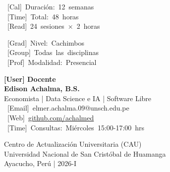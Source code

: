 \documentclass[12pt,a4paper]{yaac-luatex}
\newcommand{\faCalendar}{[Cal]}
\newcommand{\faClock}{[Time]}
\newcommand{\faBookReader}{[Read]}
\newcommand{\faUserGraduate}{[Grad]}
\newcommand{\faUsers}{[Group]}
\newcommand{\faChalkboardTeacher}{[Prof]}
\newcommand{\faUser}{[User]}
\newcommand{\faEnvelope}{[Email]}
\newcommand{\faGlobe}{[Web]}
\newcommand{\icontext}[2]{
	\mbox{%
		\textcolor{maincolor}{#1}\hspace{0.3em}%
		{#2}%
	}%
}
\begin{document}
\begin{titlepage}
\begin{tcolorbox}[
			enhanced,
			colback=white,
			colframe=maincolor,
			arc=3pt,
			boxrule=2pt,
			left=15pt,
			right=15pt,
			top=12pt,
			bottom=12pt,
			width=0.9\textwidth
			]
		\end{tcolorbox}
		
		\vspace{1cm}
		
		\begin{minipage}{0.45\textwidth}
			\begin{tcolorbox}[
				enhanced,
				colback=lightgray,
				colframe=darkgray,
				arc=3pt,
				boxrule=1pt,
				left=10pt,
				right=10pt,
				top=8pt,
				bottom=8pt
				]
				\icontext{\faCalendar}{Duración: 12 semanas}\\[0.2cm]
				\icontext{\faClock}{Total: 48 horas}\\[0.2cm]
				\icontext{\faBookReader}{24 sesiones × 2 horas}
			\end{tcolorbox}
		\end{minipage}
		\hfill
		\begin{minipage}{0.45\textwidth}
			\begin{tcolorbox}[
				enhanced,
				colback=lightgray,
				colframe=darkgray,
				arc=3pt,
				boxrule=1pt,
				left=10pt,
				right=10pt,
				top=8pt,
				bottom=8pt
				]
				\icontext{\faUserGraduate}{Nivel: Cachimbos}\\[0.2cm]
				\icontext{\faUsers}{Todas las disciplinas}\\[0.2cm]
				\icontext{\faChalkboardTeacher}{Modalidad: Presencial}
			\end{tcolorbox}
		\end{minipage}
		
		\vfill
		
		\begin{tcolorbox}[
			enhanced,
			colback=white,
			colframe=darkgray,
			arc=3pt,
			boxrule=1pt,
			left=12pt,
			right=12pt,
			top=10pt,
			bottom=10pt
			]
			{\color{maincolor}\Large\bfseries\faUser \hspace{0.3em} Docente}\\[0.3cm]
			{\large\bfseries Edison Achalma, B.S.}\\[0.1cm]
			{\normalsize Economista | Data Science e IA | Software Libre}\\[0.2cm]
			\icontext{\faEnvelope}{elmer.achalma.09@unsch.edu.pe}\\[0.1cm]
			\icontext{\faGlobe}{\href{https://github.com/achalmed}{github.com/achalmed}}\\[0.1cm]
			\icontext{\faClock}{Consultas: Miércoles 15:00-17:00 hrs}
		\end{tcolorbox}
		
		\vspace{0.5cm}
		{\color{mediumgray}\small Centro de Actualización Universitaria (CAU)}\\
		{\color{mediumgray}\small Universidad Nacional de San Cristóbal de Huamanga}\\
		{\color{mediumgray}\small Ayacucho, Perú | 2026-I}
		
	\end{titlepage}
	
\end{document}
